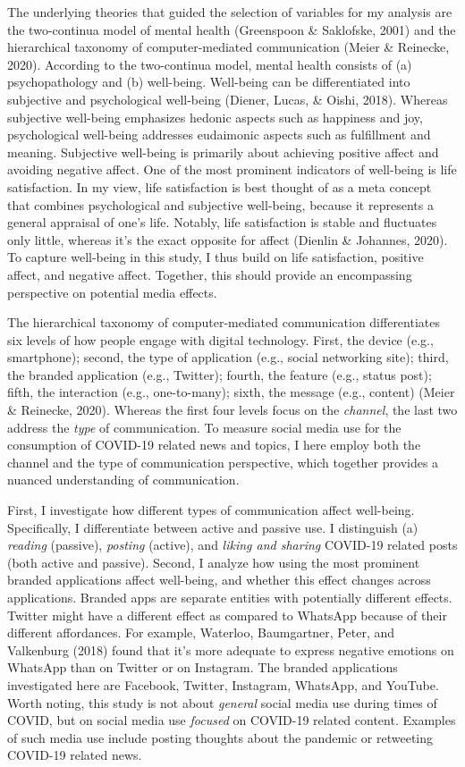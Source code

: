\documentclass[
  english,
  man,mask,floatsintext]{apa6}
\begin{document}
The underlying theories that guided the selection of variables for my analysis are the two-continua model of mental health (Greenspoon \& Saklofske, 2001) and the hierarchical taxonomy of computer-mediated communication (Meier \& Reinecke, 2020).
According to the two-continua model, mental health consists of (a) psychopathology and (b) well-being.
Well-being can be differentiated into subjective and psychological well-being (Diener, Lucas, \& Oishi, 2018).
Whereas subjective well-being emphasizes hedonic aspects such as happiness and joy, psychological well-being addresses eudaimonic aspects such as fulfillment and meaning.
Subjective well-being is primarily about achieving positive affect and avoiding negative affect.
One of the most prominent indicators of well-being is life satisfaction.
In my view, life satisfaction is best thought of as a meta concept that combines psychological and subjective well-being, because it represents a general appraisal of one's life.
Notably, life satisfaction is stable and fluctuates only little, whereas it's the exact opposite for affect (Dienlin \& Johannes, 2020).
To capture well-being in this study, I thus build on life satisfaction, positive affect, and negative affect.
Together, this should provide an encompassing perspective on potential media effects.

The hierarchical taxonomy of computer-mediated communication differentiates six levels of how people engage with digital technology.
First, the device (e.g., smartphone); second, the type of application (e.g., social networking site); third, the branded application (e.g., Twitter); fourth, the feature (e.g., status post); fifth, the interaction (e.g., one-to-many); sixth, the message (e.g., content) (Meier \& Reinecke, 2020).
Whereas the first four levels focus on the \emph{channel}, the last two address the \emph{type} of communication.
To measure social media use for the consumption of COVID-19 related news and topics, I here employ both the channel and the type of communication perspective, which together provides a nuanced understanding of communication.

First, I investigate how different types of communication affect well-being.
Specifically, I differentiate between active and passive use.
I distinguish (a) \emph{reading} (passive), \emph{posting} (active), and \emph{liking and sharing} COVID-19 related posts (both active and passive).
Second, I analyze how using the most prominent branded applications affect well-being, and whether this effect changes across applications.
Branded apps are separate entities with potentially different effects.
Twitter might have a different effect as compared to WhatsApp because of their different affordances.
For example, Waterloo, Baumgartner, Peter, and Valkenburg (2018) found that it's more adequate to express negative emotions on WhatsApp than on Twitter or on Instagram.
The branded applications investigated here are Facebook, Twitter, Instagram, WhatsApp, and YouTube.
Worth noting, this study is not about \emph{general} social media use during times of COVID, but on social media use \emph{focused} on COVID-19 related content.
Examples of such media use include posting thoughts about the pandemic or retweeting COVID-19 related news.
\end{document}
